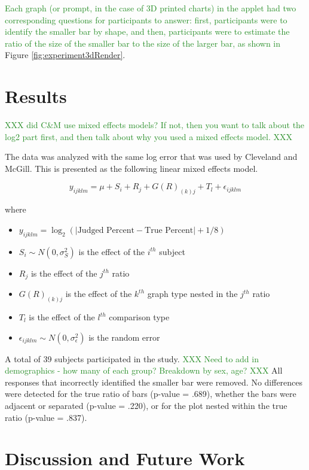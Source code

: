 \documentclass[letterpaper,inpress,dvipsnames]{jdsart}
\begin{document}
{\textcolor{ForestGreen}{Each graph (or prompt, in the case of 3D printed charts) in the applet had two corresponding questions for participants to answer: first, participants were to identify the smaller bar by shape, and then, participants were to estimate the ratio of the size of the smaller bar to the size of the larger bar, as shown in}} Figure \ref{fig:experiment3dRender}.

\hypertarget{results}{%
\section{Results}\label{results}}

{\textcolor{ForestGreen}{XXX did C\&M use mixed effects models? If not, then you want to talk about the log2 part first, and then talk about why you used a mixed effects model. XXX}}

The data was analyzed with the same log error that was used by Cleveland and McGill. This is presented as the following linear mixed effects model.

\[y_{ijklm}=\mu+S_i+R_j+G(R)_{(k)j}+T_l+\epsilon_{ijklm}\]

\noindent where

\begin{itemize}
\item
  \(y_{ijklm}=\log_2(|\text{Judged Percent} - \text{True Percent}|+1/8)\)
\item
  \(S_i\sim N(0,\sigma^2_S)\) is the effect of the \(i^{th}\) subject
\item
  \(R_j\) is the effect of the \(j^{th}\) ratio
\item
  \(G(R)_{(k)j}\) is the effect of the \(k^{th}\) graph type nested in the \(j^{th}\) ratio
\item
  \(T_l\) is the effect of the \(l^{th}\) comparison type
\item
  \(\epsilon_{ijklm}\sim N(0,\sigma^2_\epsilon)\) is the random error
\end{itemize}

A total of 39 subjects participated in the study. {\textcolor{ForestGreen}{XXX Need to add in demographics - how many of each group? Breakdown by sex, age? XXX}}
All responses that incorrectly identified the smaller bar were removed.
No differences were detected for the true ratio of bars (p-value = .689), whether the bars were adjacent or separated (p-value = .220), or for the plot nested within the true ratio (p-value = .837).

\hypertarget{discussion-and-future-work}{%
\section{Discussion and Future Work}\label{discussion-and-future-work}}
\end{document}
